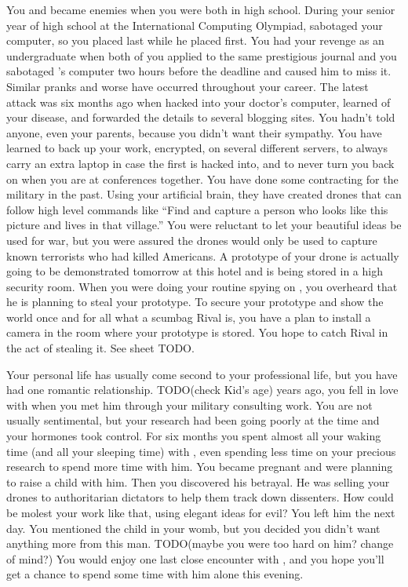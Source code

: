 \documentclass[char]{guildcamp1}
\begin{document}
You and \cRival{} became enemies when you were both in high school.  During your senior year of high school at the International Computing Olympiad, \cRival{} sabotaged your computer, so you placed last while he placed first.  You had your revenge as an undergraduate when both of you applied to the same prestigious journal and you sabotaged \cRival{}'s computer two hours before the deadline and caused him to miss it.  Similar pranks and worse have occurred throughout your career.  The latest attack was six months ago when \cRival{} hacked into your doctor's computer, learned of your disease, and forwarded the details to several blogging sites.  You hadn't told anyone, even your parents, because you didn't want their sympathy.  You have learned to back up your work, encrypted, on several different servers, to always carry an extra laptop in case the first is hacked into, and to never turn you back on \cRival{} when you are at conferences together. 
You have done some contracting for the military in the past.  Using your artificial brain, they have created drones that can follow high level commands like ``Find and capture a person who looks like this picture and lives in that village.''  You were reluctant to let your beautiful ideas be used for war, but you were assured the drones would only be used to capture known terrorists who had killed Americans.  A prototype of your drone is actually going to be demonstrated tomorrow at this hotel and is being stored in a high security room.  When you were doing your routine spying on \cRival{}, you overheard that he is planning to steal your prototype.  To secure your prototype and show the world once and for all what a scumbag Rival is, you have a plan to install a camera in the room where your prototype is stored.  You hope to catch Rival in the act of stealing it. See sheet TODO.

Your personal life has usually come second to your professional life, but you have had one romantic relationship.  TODO(check Kid's age) years ago, you fell in love with \cGroomA{\intro{}} when you met him through your military consulting work.  You are not usually sentimental, but your research had been going poorly at the time and your hormones took control. For six months you spent almost all your waking time (and all your sleeping time) with \cGroomA{},%
even spending less time on your precious research to spend more time with him.  You became pregnant and were planning to raise a child with him.  Then you discovered his betrayal.  He was selling your drones to authoritarian dictators to help them track down dissenters.  How could be molest your work like that, using elegant ideas for evil?  You left him the next day.  You mentioned the child in your womb, but you decided you didn't want anything more from this man.  TODO(maybe you were too hard on him? change of mind?)
You would enjoy one last close encounter with \cGroomA{}, and you hope you'll get a chance to spend some time with him alone this evening.
\end{document}
